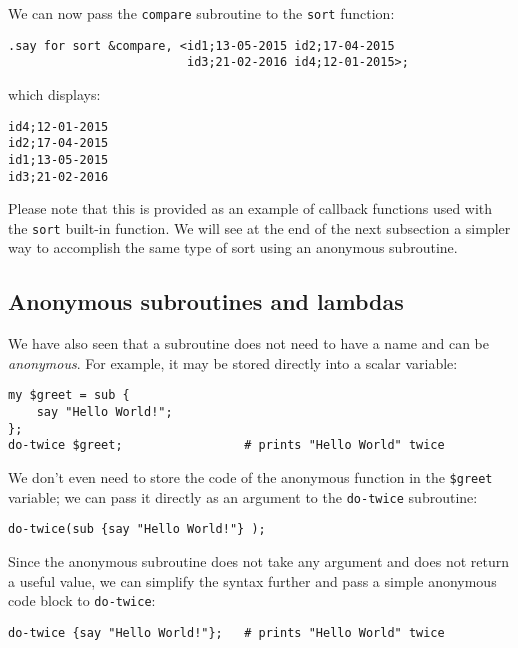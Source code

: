 We can now pass the {\tt compare} subroutine to the 
{\tt sort} function:
\begin{verbatim}
.say for sort &compare, <id1;13-05-2015 id2;17-04-2015 
                         id3;21-02-2016 id4;12-01-2015>;
\end{verbatim}

which displays:
\begin{verbatim}
id4;12-01-2015
id2;17-04-2015
id1;13-05-2015
id3;21-02-2016
\end{verbatim}

Please note that this is provided as an example of callback 
functions used with the {\tt sort} built-in function. We will 
see at the end of the next subsection a simpler way to accomplish 
the same type of sort using an anonymous subroutine. 

\subsection{Anonymous subroutines and lambdas}

We have also seen that a subroutine does not need to 
have a name and can be \emph{anonymous}. For example, 
it may be stored directly into a scalar variable:

\begin{verbatim}
my $greet = sub {
    say "Hello World!";
};
do-twice $greet;                 # prints "Hello World" twice
\end{verbatim}

We don't even need to store the code of the anonymous function 
in the \verb'$greet' variable; we can pass it directly as an 
argument to the {\tt do-twice} subroutine:

\begin{verbatim}
do-twice(sub {say "Hello World!"} );
\end{verbatim}

Since the anonymous subroutine does not take any argument 
and does not return a useful value, we can simplify the 
syntax further and pass a simple anonymous code block 
to {\tt do-twice}:

\begin{verbatim}
do-twice {say "Hello World!"};   # prints "Hello World" twice
\end{verbatim}

